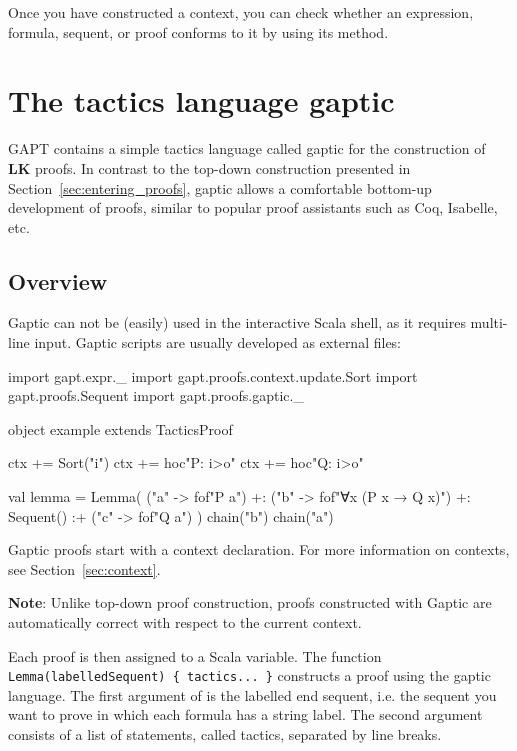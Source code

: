 \documentclass[a4paper,11pt]{book}
\newcommand{\LK}{\textbf{LK}}
\newcommand{\cli}[1]{{\ttfamily {#1}}}
\begin{document}
Once you have constructed a context, you can check whether an expression, formula, sequent, or proof conforms to it by using its \cli{check} method.

\section{The tactics language gaptic}\label{sec:gaptic}

GAPT contains a simple tactics language called gaptic for the construction of {\LK} proofs.
In contrast to the top-down construction presented in Section~\ref{sec:entering_proofs},
gaptic allows a comfortable bottom-up development of proofs, similar
to popular proof assistants such as Coq, Isabelle, etc.

\subsection{Overview}

Gaptic can not be (easily) used in the interactive Scala shell, as it requires
multi-line input.  Gaptic scripts are usually developed as external files:
\begin{tacticslisting}
import gapt.expr._
import gapt.proofs.context.update.Sort
import gapt.proofs.Sequent
import gapt.proofs.gaptic._

object example extends TacticsProof {
  ctx += Sort("i")
  ctx += hoc"P: i>o"
  ctx += hoc"Q: i>o"

  val lemma = Lemma(
    ("a" -> fof"P a") +:
    ("b" -> fof"∀x (P x → Q x)") +:
    Sequent()
    :+ ("c" -> fof"Q a")
  ) {
    chain("b")
    chain("a")
  }
}
\end{tacticslisting}
\begin{tacticsoutput}
\end{tacticsoutput}

Gaptic proofs start with a context declaration. For more information on
contexts, see Section~\ref{sec:context}.

\textbf{Note}: Unlike top-down proof construction, proofs constructed with Gaptic
are automatically correct with respect to the current context.

Each proof is then assigned to a Scala variable.  The function
\verb,Lemma(labelledSequent) { tactics... }, constructs a proof using the
gaptic language.  The first argument of \cli{Lemma} is the labelled end
sequent, i.e. the sequent you want to prove in which each formula has a string
label.  The second argument consists of a list of statements, called tactics,
separated by line breaks.
\end{document}
